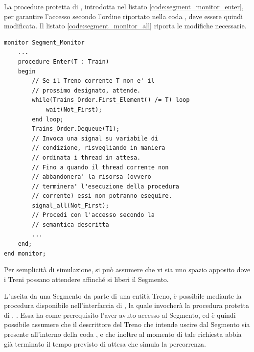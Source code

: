 \begin{description}
	La procedure protetta  di , introdotta nel listato \ref{code:segment_monitor_enter}, per garantire l'accesso secondo l'ordine riportato nella coda , deve essere quindi modificata. Il listato \ref{code:segment_monitor_all} riporta le modifiche necessarie.
	
\begin{lstlisting}[label=code:segment_monitor_all,caption=\small{Struttura della risorsa \ii{monitor} che regola l'accesso al Segmento.}]
monitor Segment_Monitor
	...
	procedure Enter(T : Train) 
	begin
		// Se il Treno corrente T non e' il
		// prossimo designato, attende.
		while(Trains_Order.First_Element() /= T) loop
			wait(Not_First);
		end loop;
		Trains_Order.Dequeue(T1);
		// Invoca una signal su variabile di 
		// condizione, risvegliando in maniera
		// ordinata i thread in attesa.
		// Fino a quando il thread corrente non
		// abbandonera' la risorsa (ovvero 
		// terminera' l'esecuzione della procedura
		// corrente) essi non potranno eseguire.
		signal_all(Not_First);
		// Procedi con l'accesso secondo la 
		// semantica descritta
		...
	end;
end monitor;	
\end{lstlisting}
			
		Per semplicità di simulazione, si può assumere che vi sia uno spazio apposito dove i Treni possano attendere affinché si liberi il Segmento.
			  
			\item {}
			
			L'uscita da una Segmento da parte di una entità Treno, è possibile mediante la procedura  disponibile nell'interfaccia di , la quale invocherà la procedura protetta di , . Essa ha come prerequisito l'aver avuto accesso al Segmento, ed è quindi possibile assumere che il descrittore del Treno che intende uscire dal Segmento sia presente all'interno della coda , e che inoltre al momento di tale richiesta abbia già terminato il tempo previsto di attesa che simula la percorrenza.
			

\end{description}
